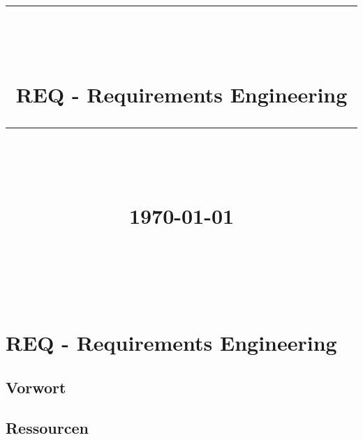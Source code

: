 \documentclass[12pt]{article}
\newcommand{\HRule}[1]{\rule{\linewidth}{#1}}
\begin{document}
\hypersetup{
    citecolor=black,
    filecolor=black,
    linkcolor=black,
    urlcolor=black
}


\title{ \normalsize
		\HRule{0.5pt} \\
		\LARGE \textbf{\uppercase{\newCommandDiscipline}} \\
    \smallbreak
    \small\textbf{{REQ - Requirements Engineering}}\\
		\HRule{2pt} \\ [0.5cm]
    \small\textbf{{\newCommandTerm}}\\
    [0.5cm]
    \normalsize \today \vspace*{10\baselineskip}}

\date{}



\author{
    \newCommandName \\
		\newCommandMatriculationNumber \\
		\newCommandUniversity \\
		\newCommandFaculty
}


\maketitle
\thispagestyle{empty}

\newpage
\pagestyle{myfancy}
\tableofcontents
\newpage

\sectionfont{\scshape}

\section{REQ - Requirements Engineering}

\subsection{Vorwort}
\subsection{Ressourcen}









\end{document}
